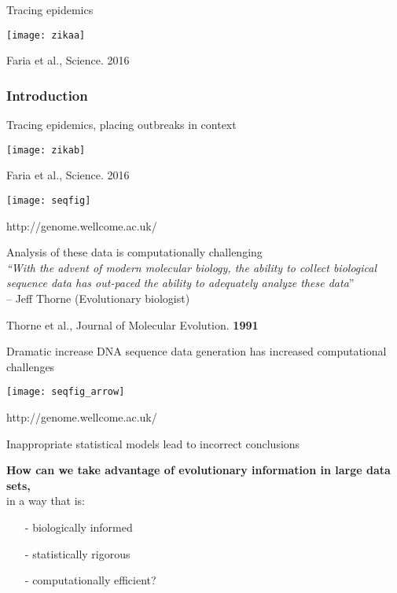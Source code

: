\documentclass{beamer}
\begin{document}
\begin{frame}
Tracing epidemics
\centerline{\texttt{[image: zikaa]}}
\tiny{Faria et al., Science. 2016}
\end{frame}

\begin{frame}
\frametitle{Introduction}
Tracing epidemics, placing outbreaks in context
\centerline{\texttt{[image: zikab]}}
\tiny{Faria et al., Science. 2016}
\end{frame}


\begin{frame}
\centerline{\texttt{[image: seqfig]}}
\tiny{http://genome.wellcome.ac.uk/}
\end{frame}


\begin{frame}
\begin{center}
Analysis of these data is computationally challenging\\
\bigskip
\Large{\emph{
``With the advent of modern molecular biology, the ability to collect biological sequence data has out-paced the ability to adequately analyze these data}''\\-- Jeff Thorne (Evolutionary biologist)\\}
\end{center}
\pause
\bigskip
Thorne et al., Journal of Molecular Evolution. \textbf{1991}
\end{frame}

\begin{frame}
Dramatic increase DNA sequence data generation has increased computational challenges\\
\centerline{\texttt{[image: seqfig\_arrow]}}
\tiny{http://genome.wellcome.ac.uk/}
\end{frame}

\begin{frame}
\begin{center}
Inappropriate statistical models lead to incorrect conclusions\\
\end{center}
\end{frame}




\begin{frame}
\textbf{How can we take advantage of evolutionary information in large data sets,}\\
in a way that is:
\begin{itemize}
 \item[-] biologically informed
 \item[-] statistically rigorous
 \item[-] computationally efficient?
\end{itemize}
\end{frame}
\end{document}
